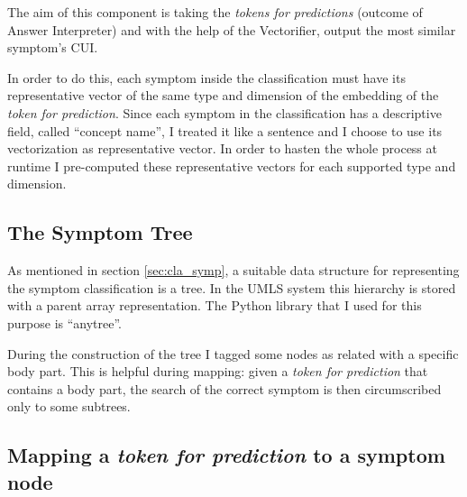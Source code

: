The aim of this component is taking the \textit{tokens for predictions} (outcome of Answer Interpreter) and with the help of the Vectorifier, output the most similar symptom's CUI.

In order to do this, each symptom inside the classification must have its representative vector of the same type and dimension of the embedding of the \textit{token for prediction}. Since each symptom in the classification has a descriptive field, called ``concept name'', I treated it like a sentence and I choose to use its vectorization as representative vector. In order to hasten the whole process at runtime I pre-computed these representative vectors for each supported type and dimension.

\subsection{The Symptom Tree}
As mentioned in section \ref{sec:cla_symp}, a suitable data structure for representing the symptom classification is a tree. In the UMLS system this hierarchy is stored with a parent array representation. The Python library that I used for this purpose is ``anytree''.

During the construction of the tree I tagged some nodes as related with a specific body part. This is helpful during mapping: given a \textit{token for prediction} that contains a body part, the search of the correct symptom is then circumscribed only to some subtrees.

\subsection{Mapping a \textit{token for prediction} to a symptom node}

